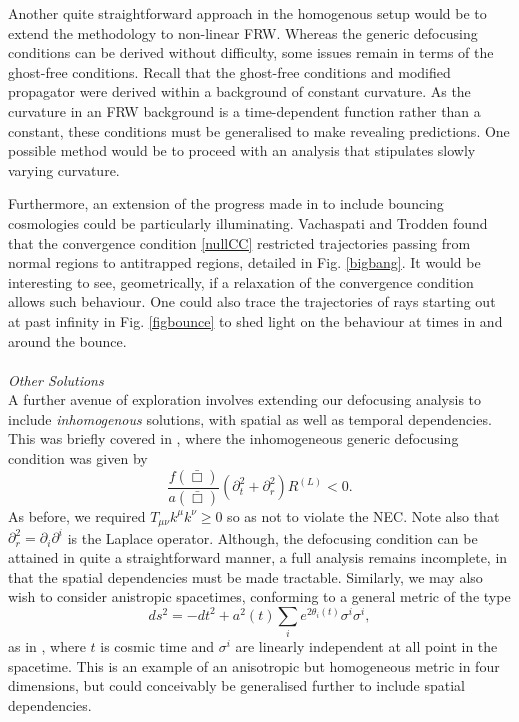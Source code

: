 Another quite straightforward approach in the homogenous setup would be to extend the methodology to non-linear FRW. Whereas the generic defocusing conditions can be derived without difficulty, some issues remain in terms of the ghost-free conditions. Recall that the ghost-free conditions and modified propagator were derived within a background of constant curvature. As the curvature in an FRW background is a time-dependent function rather than a constant, these conditions must be generalised to make revealing predictions. One possible method would be to proceed with an analysis that stipulates slowly varying curvature.

Furthermore, an extension of the progress made in \cite{Vachaspati:1998dy} to include bouncing cosmologies could be particularly illuminating. Vachaspati and Trodden found that the convergence condition \eqref{nullCC} restricted trajectories passing from normal regions to antitrapped regions, detailed in Fig. \ref{bigbang}. It would be interesting to see, geometrically, if a relaxation of the convergence condition allows such behaviour. One could also trace the trajectories of rays starting out at past infinity in Fig. \ref{figbounce} to shed light on the behaviour at times in and around the bounce. 
\\\\\emph{Other Solutions}\\
A further avenue of exploration involves extending our defocusing analysis to include \emph{inhomogenous} solutions, with spatial as well as temporal dependencies. This was briefly covered in \cite{Conroy:2016sac}, where the inhomogeneous generic defocusing condition was given by
\[
\frac{f(\bar\Box)}{a(\bar\Box)}\left(\partial_{t}^{2}+\partial_r^2\right)R^{(L)}<0
.\]
As before, we required $T_{\mu\nu}k^\mu k^\nu \geq 0$ so as not to violate the NEC. Note also that $\partial_r^2=\partial_i\partial^i$ is the Laplace operator. Although, the defocusing condition can be attained in quite a straightforward manner, a full analysis remains incomplete, in that the spatial dependencies must be made tractable. Similarly, we may also wish to consider anistropic spacetimes, conforming to a general metric of the type 
\[
ds^2=-dt^2+a^2(t)\sum_i e^{2\theta_i (t)}\sigma^i \sigma^i
,\]
as in \cite{Cai:2013vm}, where $t$ is cosmic time and $\sigma^i$ are linearly independent at all point in the spacetime. This is an example of an anisotropic but homogeneous metric in four dimensions, but could conceivably be generalised further to include spatial dependencies.
